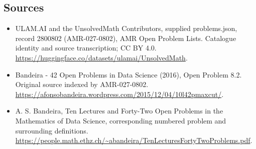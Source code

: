 \documentclass[11pt,a4paper]{article}
\begin{document}
\subsection{Sources}
\begin{itemize}
\item[S1] ULAM.AI and the UnsolvedMath Contributors, supplied problems.json, record 2800802 (AMR-027-0802), AMR Open Problem Lists. Catalogue identity and source transcription; CC BY 4.0.
\url{https://huggingface.co/datasets/ulamai/UnsolvedMath}.
\item[S2] Bandeira - 42 Open Problems in Data Science (2016), Open Problem 8.2. Original source indexed by AMR-027-0802.
\url{https://afonsobandeira.wordpress.com/2015/12/04/10l42pmaxcut/}.
\item[S3] A. S. Bandeira, Ten Lectures and Forty-Two Open Problems in the Mathematics of Data Science, corresponding numbered problem and surrounding definitions.
\url{https://people.math.ethz.ch/~abandeira/TenLecturesFortyTwoProblems.pdf}.
\end{itemize}
\end{document}
